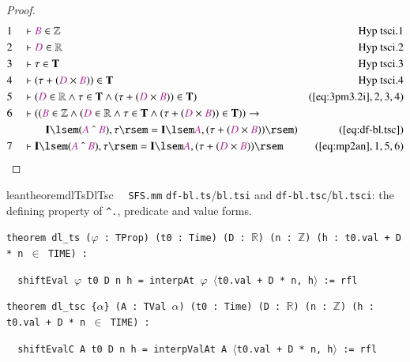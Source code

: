 \begin{proof}
\begin{align}
  1 &&  & \vdash \mc{B} \in \mathbb{Z}&\text{Hyp~tsci.1}\notag%
  \\ 2 &&  & \vdash \mc{D} \in \mathbb{R}&\text{Hyp~tsci.2}\notag%
  \\ 3 &&  & \vdash \tau \in \mathbf{T}&\text{Hyp~tsci.3}\notag%
  \\ 4 &&  & \vdash ( \tau + ( \mc{D} \times \mc{B} ) ) \in
      \mathbf{T}&\text{Hyp~tsci.4}\notag%
  \\ 5 &&  & \vdash ( \mc{D} \in \mathbb{R} \wedge \tau \in \mathbf{T} \wedge (
      \tau + ( \mc{D} \times \mc{B} ) ) \in \mathbf{T}
      )&(\mbox{\ref{eq:3pm3.2i}},2,3,4)\notag
  \\ 6 &&  & \vdash ( ( \mc{B} \in \mathbb{Z} \wedge ( \mc{D} \in \mathbb{R}
      \wedge \tau \in \mathbf{T} \wedge ( \tau + ( \mc{D}
      \times \mc{B} ) ) \in \mathbf{T} ) ) \rightarrow \notag \\ & & & \qquad
      \mathbf{I} \lsem ( \mc{A} ~\string^~ \mc{B} ) , \tau
      \rsem = \mathbf{I} \lsem \mc{A} , ( \tau + ( \mc{D}
      \times \mc{B} ) ) \rsem
      )&(\mbox{\ref{eq:df-bl.tsc}})\notag
  \\ 7 &&  & \vdash \mathbf{I} \lsem ( \mc{A} ~\string^~ \mc{B} ) , \tau \rsem
      = \mathbf{I} \lsem \mc{A} , ( \tau + ( \mc{D} \times
      \mc{B} ) ) \rsem&(\mbox{\ref{eq:mp2an}},1,5,6)\notag
\end{align}
\end{proof}

\begin{restatable}{leantheorem}{dlTsDlTsc}~~ \texttt{SFS.mm} \texttt{df-bl.ts}/\texttt{bl.tsi} and \texttt{df-bl.tsc}/\texttt{bl.tsci}: the defining property of \texttt{\^{}.}, predicate and value forms.

\texttt{\textcolor{leancolor}{theorem} \textcolor{leanyellow}{dl\_ts} ($\varphi$ : TProp) (t0 : Time) (D : $\mathbb{R}$) (n : $\mathbb{Z}$) (h : t0.val + D * n $\in$ TIME) :}

\texttt{~~shiftEval $\varphi$ t0 D n h = interpAt $\varphi$ $\langle$t0.val + D * n, h$\rangle$ := rfl}

\texttt{\textcolor{leancolor}{theorem} \textcolor{leanyellow}{dl\_tsc} \{$\alpha$\} (A : TVal $\alpha$) (t0 : Time) (D : $\mathbb{R}$) (n : $\mathbb{Z}$) (h : t0.val + D * n $\in$ TIME) :}

\texttt{~~shiftEvalC A t0 D n h = interpValAt A $\langle$t0.val + D * n, h$\rangle$ := rfl}
\label{dl_ts}
\label{dl_tsc}
\end{restatable}

